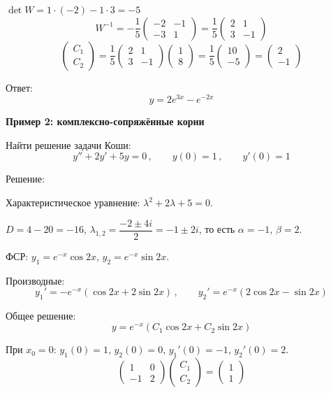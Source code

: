 \documentclass[11pt,a4paper]{article}
\newcommand{\example}[1]{\par\medskip\noindent\textbf{#1}\par\nopagebreak\smallskip}
\begin{document}
$\det W = 1 \cdot (-2) - 1 \cdot 3 = -5$
\[
  W^{-1} = -\frac15 \begin{pmatrix} -2 & -1 \\ -3 & 1 \end{pmatrix}
  = \frac15 \begin{pmatrix} 2 & 1 \\ 3 & -1 \end{pmatrix}
\]
\[
  \begin{pmatrix} C_1 \\ C_2 \end{pmatrix}
  = \frac15 \begin{pmatrix} 2 & 1 \\ 3 & -1 \end{pmatrix} \begin{pmatrix} 1 \\ 8 \end{pmatrix}
  = \frac15 \begin{pmatrix} 10 \\ -5 \end{pmatrix}
  = \begin{pmatrix} 2 \\ -1 \end{pmatrix}
\]

Ответ:
\[
  y = 2e^{3x} - e^{-2x}
\]

\example{Пример 2: комплексно-сопряжённые корни}

Найти решение задачи Коши:
\[
  y'' + 2y' + 5y = 0\,, \qquad y(0) = 1\,, \qquad y'(0) = 1
\]

Решение:

Характеристическое уравнение: $\lambda^2 + 2\lambda + 5 = 0$.

$D = 4 - 20 = -16$, $\lambda_{1,2} = \dfrac{-2 \pm 4i}{2} = -1 \pm 2i$, то есть $\alpha = -1$, $\beta = 2$.

ФСР: $y_1 = e^{-x}\cos 2x$, $y_2 = e^{-x}\sin 2x$.

Производные:
\[
  y_1' = -e^{-x}(\cos 2x + 2\sin 2x)\,, \qquad y_2' = e^{-x}(2\cos 2x - \sin 2x)
\]

Общее решение:
\[
  y = e^{-x}(C_1\cos 2x + C_2\sin 2x)
\]

При $x_0 = 0$: $y_1(0) = 1$, $y_2(0) = 0$, $y_1'(0) = -1$, $y_2'(0) = 2$.
\[
  \begin{pmatrix} 1 & 0 \\ -1 & 2 \end{pmatrix}
  \begin{pmatrix} C_1 \\ C_2 \end{pmatrix}
  =
  \begin{pmatrix} 1 \\ 1 \end{pmatrix}
\]
\end{document}
